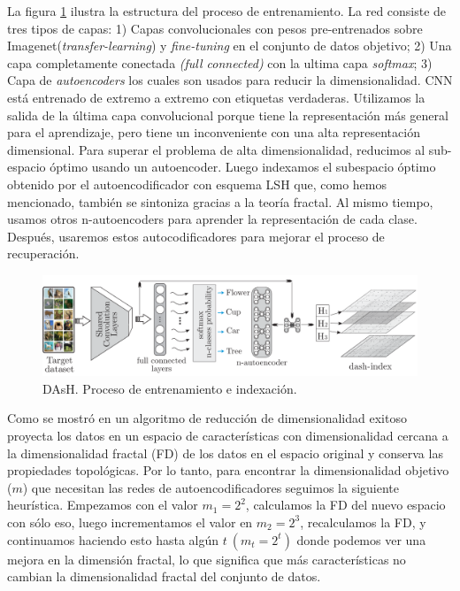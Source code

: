 La figura \ref{fig:dash} ilustra la estructura del proceso de entrenamiento. La red consiste de tres tipos de capas: 1) Capas convolucionales con pesos pre-entrenados sobre Imagenet(\textit{transfer-learning}) y \textit{fine-tuning} en el conjunto de datos objetivo; 2) Una capa completamente conectada \textit{(full connected)} con la ultima capa \textit{softmax}; 3) Capa de \textit{autoencoders} los cuales son usados para reducir la dimensionalidad. \acf{CNN} está entrenado de extremo a extremo con etiquetas verdaderas. Utilizamos la salida de la última capa convolucional porque tiene la representación más general para el aprendizaje, pero tiene un inconveniente con una alta representación dimensional. Para superar el problema de alta dimensionalidad, reducimos al sub-espacio óptimo usando un autoencoder. Luego indexamos el subespacio óptimo obtenido por el autoencodificador con esquema LSH que, como hemos mencionado, también se sintoniza gracias a la teoría fractal. Al mismo tiempo, usamos otros n-autoencoders para aprender la representación de cada clase. Después, usaremos estos autocodificadores para mejorar el proceso de recuperación.  
\begin{figure}[htp]\centering
\includegraphics[width=1.0\columnwidth]{chapter6/DAsh_learning_final.pdf}
\caption{ DAsH. Proceso de entrenamiento e indexación. } 
\label{fig:dash}
\end{figure}    

Como se mostró en \cite{citeulike:fractal:encoders} un algoritmo de reducción de dimensionalidad exitoso proyecta los datos en un espacio de características con dimensionalidad cercana a la dimensionalidad fractal (FD) de los datos en el espacio original y conserva las propiedades topológicas.  Por lo tanto, para encontrar la dimensionalidad objetivo ($m$) que necesitan las redes de autoencodificadores seguimos la siguiente heurística.  Empezamos con el valor $m_1 = 2^2$, calculamos la FD del nuevo espacio con sólo eso, luego incrementamos el valor en $m_2 = 2^3$, recalculamos la FD, y continuamos haciendo esto hasta algún $ t\ (m_t =  2^t)$ donde podemos ver una mejora en la dimensión fractal, lo que significa que más características no cambian la dimensionalidad fractal del conjunto de datos.
 
